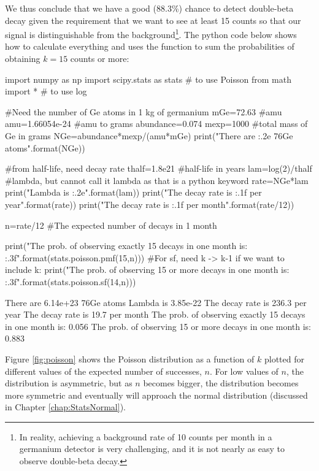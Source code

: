 \begin{example}
We thus conclude that we have a good (88.3\%) chance to detect double-beta decay given the requirement that we want to see at least 15 counts so that our signal is distinguishable from the background\footnote{In reality, achieving a background rate of 10 counts per month in a germanium detector is very challenging, and it is not nearly as easy to observe double-beta decay.}. The python code below shows how to calculate everything and uses the function  to sum the probabilities of obtaining $k=15$ counts or more:
\begin{python}[caption = Computing probabilities for the Poisson distribution] 
import numpy as np
import scipy.stats as stats # to use Poisson
from math import * # to use log

#Need the number of Ge atoms in 1 kg of germanium
mGe=72.63 #amu
amu=1.66054e-24 #amu to grams
abundance=0.074
mexp=1000 #total mass of Ge in grams
NGe=abundance*mexp/(amu*mGe)
print("There are {:.2e} 76Ge atoms".format(NGe))

#from half-life, need decay rate
thalf=1.8e21 #half-life in years
lam=log(2)/thalf #lambda, but cannot call it lambda as that is a python keyword
rate=NGe*lam
print("Lambda is {:.2e}".format(lam))
print("The decay rate is {:.1f} per year".format(rate))
print("The decay rate is {:.1f} per month".format(rate/12))

n=rate/12 #The expected number of decays in 1 month

print("The prob. of observing exactly 15 decays in one month is: {:.3f}".format(stats.poisson.pmf(15,n)))
#For sf, need k -> k-1 if we want to include k:
print("The prob. of observing 15 or more decays in one month is: {:.3f}".format(stats.poisson.sf(14,n)))
\end{python}
\begin{poutput}
There are 6.14e+23 76Ge atoms
Lambda is 3.85e-22
The decay rate is 236.3 per year
The decay rate is 19.7 per month
The prob. of observing exactly 15 decays in one month is: 0.056
The prob. of observing 15 or more decays in one month is: 0.883
\end{poutput}

\end{example}

Figure \ref{fig:poisson} shows the Poisson distribution as a function of $k$ plotted for different values of the expected number of successes, $n$. For low values of $n$, the distribution is asymmetric, but as $n$ becomes bigger, the distribution becomes more symmetric and eventually will approach the normal distribution (discussed in Chapter \ref{chap:StatsNormal}).

